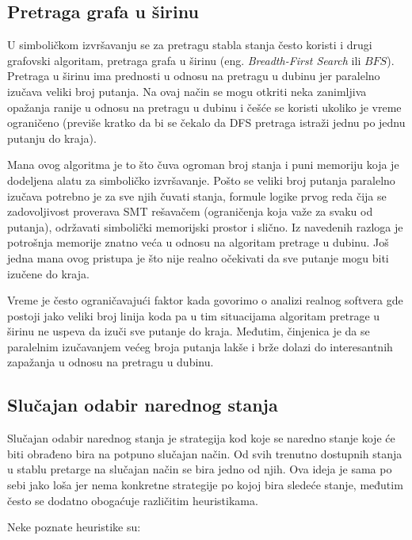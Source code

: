 \documentclass[12pt,oneside]{memoir}
\begin{document}
\bigbreak

\subsection{Pretraga grafa u širinu} \label{BFS}
U simboličkom izvršavanju se za pretragu stabla stanja često koristi i drugi grafovski algoritam, pretraga grafa u širinu (eng. \textit{Breadth-First Search} ili $BFS$). Pretraga u širinu ima prednosti u odnosu na pretragu u dubinu jer paralelno izučava veliki broj putanja. Na ovaj način se mogu otkriti neka zanimljiva opažanja ranije u odnosu na pretragu u dubinu i češće se koristi ukoliko je vreme ograničeno (previše kratko da bi se čekalo da DFS pretraga istraži jednu po jednu putanju do kraja). 

Mana ovog algoritma je to što čuva ogroman broj stanja i puni memoriju koja je dodeljena alatu za simboličko izvršavanje. Pošto se veliki broj putanja paralelno izučava potrebno je za sve njih čuvati stanja, formule logike prvog reda čija se zadovoljivost proverava SMT rešavačem (ograničenja koja važe za svaku od putanja), održavati simbolički memorijski prostor i slično. Iz navedenih razloga je potrošnja memorije znatno veća u odnosu na algoritam pretrage u dubinu. Još jedna mana ovog pristupa je što nije realno očekivati da sve putanje mogu biti izučene do kraja. 

Vreme je često ograničavajući faktor kada govorimo o analizi realnog softvera gde postoji jako veliki broj linija koda pa u tim situacijama algoritam pretrage u širinu ne uspeva da izuči sve putanje do kraja. Međutim, činjenica je da se paralelnim izučavanjem većeg broja putanja lakše i brže dolazi do interesantnih zapažanja u odnosu na pretragu u dubinu.

\bigbreak

\subsection{Slučajan odabir narednog stanja} 
Slučajan odabir narednog stanja je strategija kod koje se naredno stanje koje će biti obrađeno bira na potpuno slučajan način. Od svih trenutno dostupnih stanja u stablu pretarge na slučajan način se bira jedno od njih. Ova ideja je sama po sebi jako loša jer nema konkretne strategije po kojoj bira sledeće stanje, međutim često se dodatno obogaćuje različitim heuristikama. 

Neke poznate heuristike su:
\end{document}
